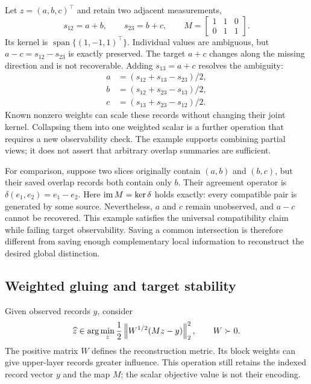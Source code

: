 Let $z=(a,b,c)^\top$ and retain two adjacent measurements,
\begin{equation}
  s_{12}=a+b,\qquad s_{23}=b+c,
  \qquad
  M=\begin{bmatrix}1&1&0\\0&1&1\end{bmatrix}.
  \label{atl:adjacent-example}
\end{equation}
Its kernel is $\operatorname{span}\{(1,-1,1)^\top\}$. Individual values are
ambiguous, but $a-c=s_{12}-s_{23}$ is exactly preserved. The target $a+c$
changes along the missing direction and is not recoverable. Adding
$s_{13}=a+c$ resolves the ambiguity:
\begin{align}
  a&=(s_{12}+s_{13}-s_{23})/2,\nonumber\\
  b&=(s_{12}+s_{23}-s_{13})/2,\nonumber\\
  c&=(s_{13}+s_{23}-s_{12})/2.
  \label{atl:example-inverse}
\end{align}
Known nonzero weights can scale these records without changing their joint
kernel. Collapsing them into one weighted scalar is a further operation that
requires a new observability check. The example supports combining partial
views; it does not assert that arbitrary overlap summaries are sufficient.

For comparison, suppose two slices originally contain $(a,b)$ and $(b,c)$,
but their saved overlap records both contain only $b$. Their agreement operator
is $\delta(e_1,e_2)=e_1-e_2$. Here $\operatorname{im} M=\ker\delta$ holds exactly: every
compatible pair is generated by some source. Nevertheless, $a$ and $c$ remain
unobserved, and $a-c$ cannot be recovered. This example satisfies the universal
compatibility claim while failing target observability. Saving a common
intersection is therefore different from saving enough complementary local
information to reconstruct the desired global distinction.

\subsection{Weighted gluing and target stability}
\label{atl:weighted-gluing}

Given observed records $y$, consider
\begin{equation}
  \widehat z\in\arg\min_z
  \frac12\left\lVert W^{1/2}(Mz-y)\right\rVert_2^2,
  \qquad W\succ0.
  \label{atl:weighted-ls}
\end{equation}
The positive matrix $W$ defines the reconstruction metric. Its block weights
can give upper-layer records greater influence. This operation still retains
the indexed record vector $y$ and the map $M$; the scalar objective value is
not their encoding.

